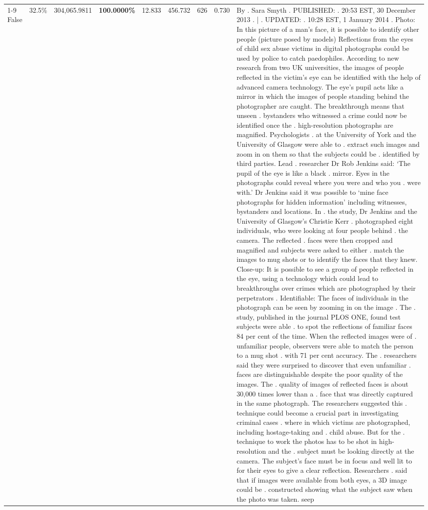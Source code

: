 \begin{table}[H]
\begin{tabular}{lllrlllll}
\cline{1-9}
False & 32.5\% & \color{red} 304,065.9811 & \bfseries \color{red} 100.0000\% & 12.833 & 456.732 & 626 & 0.730 & By . Sara Smyth . PUBLISHED: . 20:53 EST, 30 December 2013 . | . UPDATED: . 10:28 EST, 1 January 2014 . Photo: In this picture of a man's face, it is possible to identify other people (picture posed by models) Reflections from the eyes of child sex abuse victims in digital photographs could be used by police to catch paedophiles. According to new research from two UK universities, the images of people reflected in the victim's eye can be identified with the help of advanced camera technology. The eye's pupil acts like a mirror in which the images of people standing behind the photographer are caught. The breakthrough means that unseen . bystanders who witnessed a crime could now be identified once the . high-resolution photographs are magnified. Psychologists . at the University of York and the University of Glasgow were able to . extract such images and zoom in on them so that the subjects could be . identified by third parties. Lead . researcher Dr Rob Jenkins said: ‘The pupil of the eye is like a black . mirror. Eyes in the photographs could reveal where you were and who you . were with.' Dr Jenkins said it was possible to ‘mine face photographs for hidden information' including witnesses, bystanders and locations. In . the study, Dr Jenkins and the University of Glasgow's Christie Kerr . photographed eight individuals, who were looking at four people behind . the camera. The reflected . faces were then cropped and magnified and subjects were asked to either . match the images to mug shots or to identify the faces that they knew. Close-up: It is possible to see a group of people reflected in the eye, using a technology which could lead to breakthroughs over crimes which are photographed by their perpetrators . Identifiable: The faces of individuals in the photograph can be seen by zooming in on the image . The . study, published in the journal PLOS ONE, found test subjects were able . to spot the reflections of familiar faces 84 per cent of the time. When the reflected images were of . unfamiliar people, observers were able to match the person to a mug shot . with 71 per cent accuracy. The . researchers said they were surprised to discover that even unfamiliar . faces are distinguishable despite the poor quality of the images. The . quality of images of reflected faces is about 30,000 times lower than a . face that was directly captured in the same photograph. The researchers suggested this . technique could become a crucial part in investigating criminal cases . where in which victims are photographed, including hostage-taking and . child abuse. But for the . technique to work the photos has to be shot in high-resolution and the . subject must be looking directly at the camera. The subject's face must be in focus and well lit to for their eyes to give a clear reflection. Researchers . said that if images were available from both eyes, a 3D image could be . constructed showing what the subject saw when the photo was taken. seep \\

\end{tabular}
\end{table}
